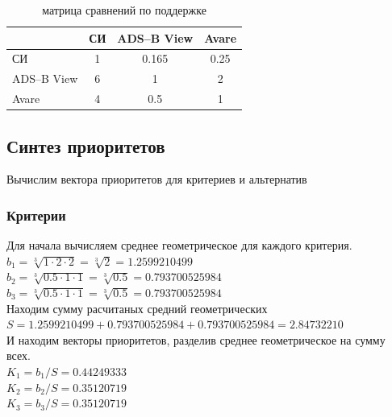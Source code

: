 \documentclass[a4paper,12pt]{report} %
\begin{document}
\begin{table}
  \caption{матрица сравнений по поддержке}
  \begin{tabular}{l|c|c|c|}
    \cline{2-4}
    {}                               & \multicolumn{1}{l|}{СИ}        & \multicolumn{1}{l|}{ADS--B View} & \multicolumn{1}{l|}{Avare} \\ \hline
    \multicolumn{1}{|l|}{СИ}         & 1                              & 0.165                           & 0.25                       \\ \hline
    \multicolumn{1}{|l|}{ADS--B View} & 6                              & 1                               & 2                          \\ \hline
    \multicolumn{1}{|l|}{Avare}      & 4                              & 0.5                             & 1                          \\ \hline
  \end{tabular}
\end{table}
\subsection{Синтез приоритетов}

Вычислим вектора приоритетов для критериев и альтернатив

\subsubsection{Критерии}

Для начала вычисляем среднее геометрическое для каждого критерия.
$ b_1=\sqrt[3]{1 \cdot 2 \cdot 2} = \sqrt[3]{2} = 1.2599210499 $ \\
$ b_2=\sqrt[3]{0.5 \cdot 1 \cdot 1} = \sqrt[3]{0.5} = 0.793700525984 $ \\
$ b_3=\sqrt[3]{0.5 \cdot 1 \cdot 1} = \sqrt[3]{0.5} = 0.793700525984 $ \\

Находим сумму расчитаных средний геометрических
\\
$ S = 1.2599210499 + 0.793700525984 + 0.793700525984 = 2.84732210 $ \\

И находим векторы приоритетов, разделив среднее геометрическое на сумму всех.
\\
$K_1 = b_1/S = 0.44249333 $ \\
$K_2 = b_2/S = 0.35120719 $ \\
$K_3 = b_3/S = 0.35120719 $ \\
\end{document}
